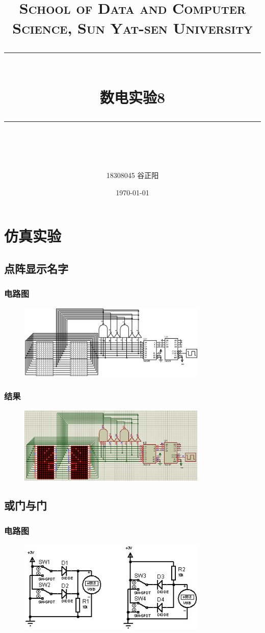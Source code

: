 \documentclass[UTF8, a4paper, 11pt]{article}
\title{	
\normalfont \normalsize
\textsc{School of Data and Computer Science, Sun Yat-sen University} \\ [25pt] %
\rule{\textwidth}{0.5pt} \\[0.4cm] %
\huge 数电实验8\\ %
\rule{\textwidth}{2pt} \\[0.5cm] %
\author{18308045 谷正阳}
\date{\normalsize\today}
}
\begin{document}
\maketitle
\tableofcontents
\newpage
\section{仿真实验}
\subsection{点阵显示名字}
\subsubsection{电路图}
\begin{figure}[H]
    \centering
    \includegraphics[width=0.8\textwidth]{ex8.1电路图.jpg}
\end{figure}
\subsubsection{结果}
\begin{figure}[H]
    \centering
    \includegraphics[width=0.8\textwidth]{ex8.1结果.png}
\end{figure}
\subsection{或门与门}
\subsubsection{电路图}
\begin{figure}[H]
    \centering
    \includegraphics[width=0.8\textwidth]{ex8.2电路图.jpg}
\end{figure}
\end{document}
